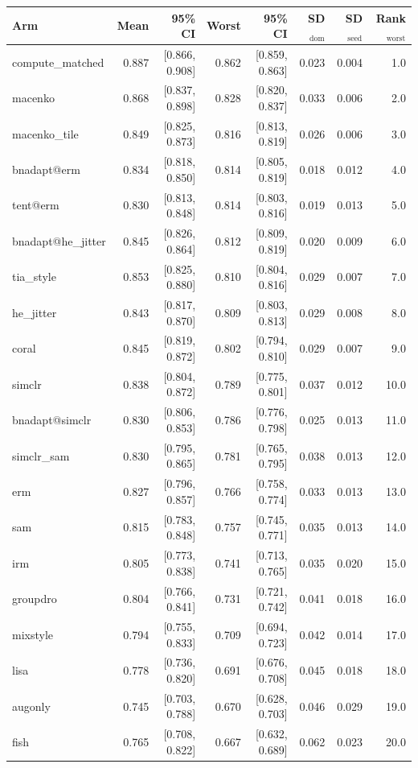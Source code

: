 \begin{tabular}{lrrrrrrr}
\toprule
Arm & Mean & 95\% CI & Worst & 95\% CI & SD$_\text{dom}$ & SD$_\text{seed}$ & Rank$_\text{worst}$ \\
\midrule
compute\_matched & 0.887 & [0.866, 0.908] & 0.862 & [0.859, 0.863] & 0.023 & 0.004 & 1.0 \\
macenko & 0.868 & [0.837, 0.898] & 0.828 & [0.820, 0.837] & 0.033 & 0.006 & 2.0 \\
macenko\_tile & 0.849 & [0.825, 0.873] & 0.816 & [0.813, 0.819] & 0.026 & 0.006 & 3.0 \\
bnadapt@erm & 0.834 & [0.818, 0.850] & 0.814 & [0.805, 0.819] & 0.018 & 0.012 & 4.0 \\
tent@erm & 0.830 & [0.813, 0.848] & 0.814 & [0.803, 0.816] & 0.019 & 0.013 & 5.0 \\
bnadapt@he\_jitter & 0.845 & [0.826, 0.864] & 0.812 & [0.809, 0.819] & 0.020 & 0.009 & 6.0 \\
tia\_style & 0.853 & [0.825, 0.880] & 0.810 & [0.804, 0.816] & 0.029 & 0.007 & 7.0 \\
he\_jitter & 0.843 & [0.817, 0.870] & 0.809 & [0.803, 0.813] & 0.029 & 0.008 & 8.0 \\
coral & 0.845 & [0.819, 0.872] & 0.802 & [0.794, 0.810] & 0.029 & 0.007 & 9.0 \\
simclr & 0.838 & [0.804, 0.872] & 0.789 & [0.775, 0.801] & 0.037 & 0.012 & 10.0 \\
bnadapt@simclr & 0.830 & [0.806, 0.853] & 0.786 & [0.776, 0.798] & 0.025 & 0.013 & 11.0 \\
simclr\_sam & 0.830 & [0.795, 0.865] & 0.781 & [0.765, 0.795] & 0.038 & 0.013 & 12.0 \\
erm & 0.827 & [0.796, 0.857] & 0.766 & [0.758, 0.774] & 0.033 & 0.013 & 13.0 \\
sam & 0.815 & [0.783, 0.848] & 0.757 & [0.745, 0.771] & 0.035 & 0.013 & 14.0 \\
irm & 0.805 & [0.773, 0.838] & 0.741 & [0.713, 0.765] & 0.035 & 0.020 & 15.0 \\
groupdro & 0.804 & [0.766, 0.841] & 0.731 & [0.721, 0.742] & 0.041 & 0.018 & 16.0 \\
mixstyle & 0.794 & [0.755, 0.833] & 0.709 & [0.694, 0.723] & 0.042 & 0.014 & 17.0 \\
lisa & 0.778 & [0.736, 0.820] & 0.691 & [0.676, 0.708] & 0.045 & 0.018 & 18.0 \\
augonly & 0.745 & [0.703, 0.788] & 0.670 & [0.628, 0.703] & 0.046 & 0.029 & 19.0 \\
fish & 0.765 & [0.708, 0.822] & 0.667 & [0.632, 0.689] & 0.062 & 0.023 & 20.0 \\
\bottomrule
\end{tabular}

